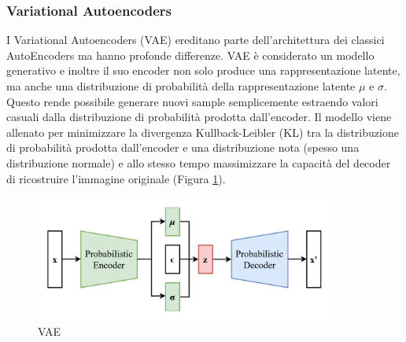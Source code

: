 \subsubsection{Variational Autoencoders}
I Variational Autoencoders (VAE) \cite{kingma2013auto} ereditano parte dell'architettura dei classici AutoEncoders ma hanno profonde differenze. VAE è considerato un modello generativo e inoltre il suo encoder non solo produce una rappresentazione latente, ma anche una distribuzione di probabilità della rappresentazione latente $\mu$ e $\sigma$. Questo rende possibile generare nuovi sample semplicemente estraendo valori casuali dalla distribuzione di probabilità prodotta dall'encoder.
Il modello viene allenato per minimizzare la divergenza Kullback-Leibler (KL) tra la distribuzione di probabilità prodotta dall'encoder e una distribuzione nota (spesso una distribuzione normale) e allo stesso tempo massimizzare la capacità del decoder di ricostruire l'immagine originale (Figura \ref{vae}).
\begin{figure}[t]
	\centering
	\includegraphics[width=10cm, scale=1]{images/vae}
	\caption{VAE}
	\label{vae}
\end{figure}

